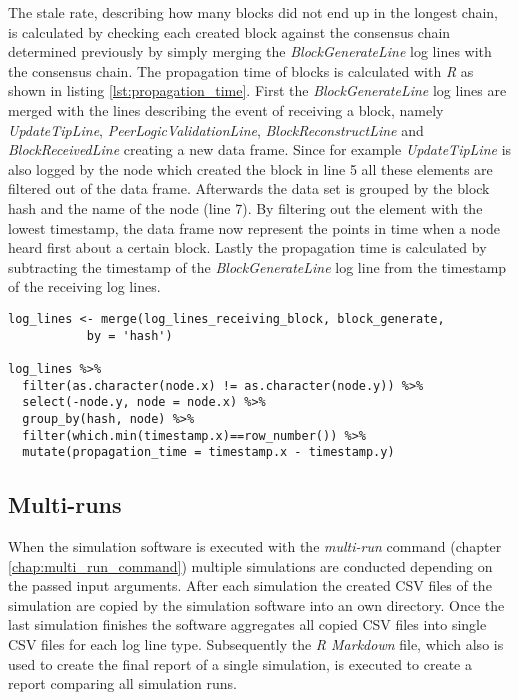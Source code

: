 The stale rate, describing how many blocks did not end up in the longest chain, is calculated by checking each created block against the consensus chain determined previously by simply merging the \textit{BlockGenerateLine} log lines with the consensus chain.
The propagation time of blocks is calculated with \textit{R} as shown in listing \ref{lst:propagation_time}.
First the \textit{BlockGenerateLine} log lines are merged with the lines describing the event of receiving a block, namely	\textit{UpdateTipLine}, \textit{PeerLogicValidationLine}, \textit{BlockReconstructLine} and \textit{BlockReceivedLine} creating a new data frame.
Since for example \textit{UpdateTipLine} is also logged by the node which created the block in line 5 all these elements are filtered out of the data frame.
Afterwards the data set is grouped by the block hash and the name of the node (line 7).
By filtering out the element with the lowest timestamp, the data frame now represent the points in time when a node heard first about a certain block.
Lastly the propagation time is calculated by subtracting the timestamp of the \textit{BlockGenerateLine} log line from the timestamp of the receiving log lines.

\begin{minipage}{\linewidth}
\begin{lstlisting}[caption=Calculation of propagation time with \textit{R}, label={lst:propagation_time}, basicstyle=\ttfamily, captionpos=b]
log_lines <- merge(log_lines_receiving_block, block_generate,
		   by = 'hash')

log_lines %>%
  filter(as.character(node.x) != as.character(node.y)) %>%
  select(-node.y, node = node.x) %>%
  group_by(hash, node) %>%
  filter(which.min(timestamp.x)==row_number()) %>%
  mutate(propagation_time = timestamp.x - timestamp.y)
\end{lstlisting}
\end{minipage}
 
\subsection{Multi-runs}

When the simulation software is executed with the \textit{multi-run} command (chapter \ref{chap:multi_run_command}) multiple simulations are conducted depending on the passed input arguments.
After each simulation the created CSV files of the simulation are copied by the simulation software into an own directory.
Once the last simulation finishes the software aggregates all copied CSV files into single CSV files for each log line type.
Subsequently the \textit{R Markdown} file, which also is used to create the final report of a single  simulation, is executed to create a report comparing all simulation runs.
 
